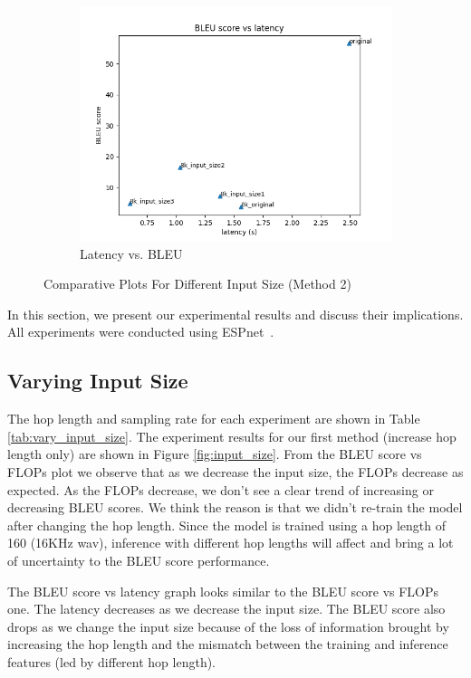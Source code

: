 \documentclass[11pt]{article}
\begin{document}
\begin{figure}[h]
\begin{subfigure}{0.32\textwidth}
        \includegraphics[width=\textwidth]{images/input_size_method2/BLEU_vs_latency.png}
        \caption{Latency vs. BLEU }
    \end{subfigure}
    \caption{\label{fig:input_size_method2}Comparative Plots For Different Input Size (Method 2)}
\end{figure}

In this section, we present our experimental results and discuss their implications.
All experiments were conducted using ESPnet~\cite{espnet}.

\subsection{Varying Input Size}

The hop length and sampling rate for each experiment are shown in Table \ref{tab:vary_input_size}.
The experiment results for our first method (increase hop length only) are shown in Figure \ref{fig:input_size}. From the BLEU score vs FLOPs plot we observe that as we decrease the input size, the FLOPs decrease as expected. As the FLOPs decrease, we don't see a clear trend of increasing or decreasing BLEU scores. We think the reason is that we didn't re-train the model after changing the hop length. Since the model is trained using a hop length of 160 (16KHz wav), inference with different hop lengths will affect and bring a lot of uncertainty to the BLEU score performance. 

The BLEU score vs latency graph looks similar to the BLEU score vs FLOPs one. The latency decreases as we decrease the input size. The BLEU score also drops as we change the input size because of the loss of information brought by increasing the hop length and the mismatch between the training and inference features (led by different hop length).
\end{document}
